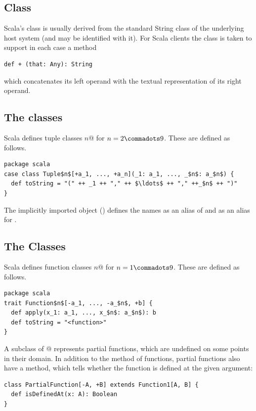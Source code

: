 {\subsection{Class \large{}}

Scala's \lstinline@String@ class is usually derived from the standard String
class of the underlying host system (and may be identified with
it). For Scala clients the class is taken to support in each case a
method
\begin{lstlisting}
def + (that: Any): String 
\end{lstlisting}
which concatenates its left operand with the textual representation of its
right operand.

\subsection{The \large{} classes}

Scala defines tuple classes \lstinline@Tuple$n$@ for $n = 2 \commadots 9$.
These are defined as follows.

\begin{lstlisting}
package scala 
case class Tuple$n$[+a_1, ..., +a_n](_1: a_1, ..., _$n$: a_$n$) {
  def toString = "(" ++ _1 ++ "," ++ $\ldots$ ++ "," ++_$n$ ++ ")"
}
\end{lstlisting}

The implicitly imported  object () defines
the names  as an alias of  and 
as an alias for .

\subsection{The \large{} Classes}
\label{sec:cls-function}

Scala defines function classes \lstinline@Function$n$@ for $n = 1 \commadots 9$.
These are defined as follows.

\begin{lstlisting}
package scala 
trait Function$n$[-a_1, ..., -a_$n$, +b] {
  def apply(x_1: a_1, ..., x_$n$: a_$n$): b 
  def toString = "<function>" 
}
\end{lstlisting}

A subclass of @ represents partial functions,
which are undefined on some points in their domain. In addition to the
 method of functions, partial functions also have a
 method, which tells whether the function is defined
at the given argument:
\begin{lstlisting}
class PartialFunction[-A, +B] extends Function1[A, B] {
  def isDefinedAt(x: A): Boolean
}
\end{lstlisting}

}
